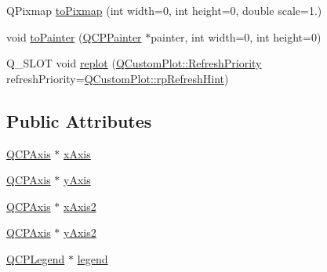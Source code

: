 \begin{DoxyCompactItemize}
\item 
Q\+Pixmap \mbox{\hyperlink{class_q_custom_plot_aabb974d71ce96c137dc04eb6eab844fe}{to\+Pixmap}} (int width=0, int height=0, double scale=1.)
\item 
void \mbox{\hyperlink{class_q_custom_plot_a1be68d5c0f1e086d6374d1340a193fb9}{to\+Painter}} (\mbox{\hyperlink{class_q_c_p_painter}{Q\+C\+P\+Painter}} $\ast$painter, int width=0, int height=0)
\item 
Q\+\_\+\+S\+L\+OT void \mbox{\hyperlink{class_q_custom_plot_aa4bfe7d70dbe67e81d877819b75ab9af}{replot}} (\mbox{\hyperlink{class_q_custom_plot_a45d61392d13042e712a956d27762aa39}{Q\+Custom\+Plot\+::\+Refresh\+Priority}} refresh\+Priority=\mbox{\hyperlink{class_q_custom_plot_a45d61392d13042e712a956d27762aa39a49666a5854a68dbcca8b277b03331260}{Q\+Custom\+Plot\+::rp\+Refresh\+Hint}})
\end{DoxyCompactItemize}
\subsection*{Public Attributes}
\begin{DoxyCompactItemize}
\item 
\mbox{\hyperlink{class_q_c_p_axis}{Q\+C\+P\+Axis}} $\ast$ \mbox{\hyperlink{class_q_custom_plot_a9a79cd0158a4c7f30cbc702f0fd800e4}{x\+Axis}}
\item 
\mbox{\hyperlink{class_q_c_p_axis}{Q\+C\+P\+Axis}} $\ast$ \mbox{\hyperlink{class_q_custom_plot_af6fea5679725b152c14facd920b19367}{y\+Axis}}
\item 
\mbox{\hyperlink{class_q_c_p_axis}{Q\+C\+P\+Axis}} $\ast$ \mbox{\hyperlink{class_q_custom_plot_ada41599f22cad901c030f3dcbdd82fd9}{x\+Axis2}}
\item 
\mbox{\hyperlink{class_q_c_p_axis}{Q\+C\+P\+Axis}} $\ast$ \mbox{\hyperlink{class_q_custom_plot_af13fdc5bce7d0fabd640f13ba805c0b7}{y\+Axis2}}
\item 
\mbox{\hyperlink{class_q_c_p_legend}{Q\+C\+P\+Legend}} $\ast$ \mbox{\hyperlink{class_q_custom_plot_a4eadcd237dc6a09938b68b16877fa6af}{legend}}
\end{DoxyCompactItemize}
